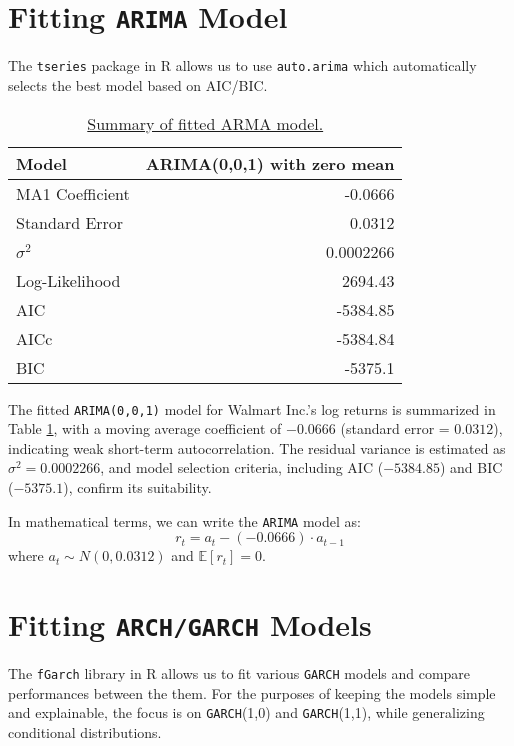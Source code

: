 \documentclass{article}
\newcommand{\1}{\mathbbm{1}}
\theoremstyle{definition}
\begin{document}
\section{Fitting \texttt{ARIMA} Model}

The \texttt{tseries} package in R allows us to use \texttt{auto.arima} which automatically selects the best model based on AIC/BIC.

\begin{table}[H]
\centering
\begin{tabular}{l|r}
\hline
\textbf{Model}  & \textbf{ARIMA(0,0,1) with zero mean} \\
\hline
MA1 Coefficient & -0.0666 \\
Standard Error  & 0.0312 \\
$\sigma^2$      & 0.0002266 \\
\hline
Log-Likelihood  & 2694.43 \\
AIC             & -5384.85 \\
AICc            & -5384.84 \\
BIC             & -5375.1 \\
\hline
\end{tabular}
\caption{\small{\href{https://github.com/Stochastic1017/Walmart-Stock-Forecasting/blob/main/R/Fit_ARMA.R}{Summary of fitted ARMA model.}}}
\label{tab:arma_model_summary}
\end{table}

The fitted \texttt{ARIMA(0,0,1)} model for Walmart Inc.'s log returns is summarized in Table \ref{tab:arma_model_summary}, with a moving average coefficient of $-0.0666$ (standard error = $0.0312$), indicating weak short-term autocorrelation. The residual variance is estimated as $\sigma^2 = 0.0002266$, and model selection criteria, including AIC ($-5384.85$) and BIC ($-5375.1$), confirm its suitability.

In mathematical terms, we can write the \texttt{ARIMA} model as:
$$r_t = a_t - (-0.0666) \cdot a_{t-1}$$
where $a_t \sim N(0, 0.0312)$ and $\mathbb{E}[r_t] = 0$.


\section{Fitting \texttt{ARCH/GARCH} Models}

The \texttt{fGarch} library in R allows us to fit various \texttt{GARCH} models and compare performances between the them. For the purposes of keeping the models simple and explainable, the focus is on \texttt{GARCH}(1,0) and \texttt{GARCH}(1,1), while generalizing conditional distributions.
\end{document}
